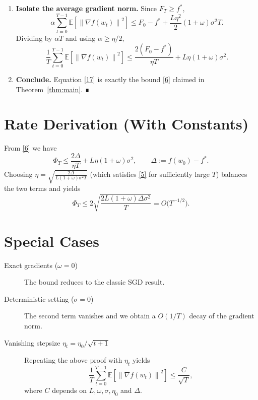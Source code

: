 \documentclass{article}
\newcommand{\EE}{\mathbb{E}}
\newcommand{\norm}[1]{\left\lVert#1\right\rVert}
\begin{document}
\begin{enumerate}[label=[Step \arabic*], leftmargin=*, itemsep=4pt]
\item \textbf{Isolate the average gradient norm.}  
Since $F_T\ge f^{*}$,
\[
\alpha\sum_{t=0}^{T-1}\EE\!\left[\norm{\nabla f(w_t)}^{2}\right]
\le F_0-f^{*}
    +\frac{L\eta^{2}}{2}(1+\omega)\sigma^{2}T.
\tag{16}
\]
Dividing by $\alpha T$ and using $\alpha\ge\eta/2$,
\[
\frac{1}{T}\sum_{t=0}^{T-1}\EE\!\left[\norm{\nabla f(w_t)}^{2}\right]
\le \frac{2(F_0-f^{*})}{\eta T}
   +L\eta(1+\omega)\sigma^{2}.
\tag{17}
\]

\item \textbf{Conclude.}  
Equation \eqref{17} is exactly the bound \eqref{6} claimed in Theorem~\ref{thm:main}. ∎
\end{enumerate}

\section*{Rate Derivation (With Constants)}
From \eqref{6} we have
\[
\Phi_T\le \frac{2\Delta}{\eta T}+L\eta(1+\omega)\sigma^{2},
\qquad \Delta:=f(w_0)-f^{*}.
\]
Choosing $\eta=\sqrt{\frac{2\Delta}{L(1+\omega)\sigma^{2}T}}$ (which satisfies \eqref{5} for sufficiently large $T$) balances the two terms and yields
\[
\Phi_T\le 2\sqrt{\frac{2L(1+\omega)\Delta\sigma^{2}}{T}}
      =O\!\bigl(T^{-1/2}\bigr).
\]

\section*{Special Cases}
\begin{description}
\item[Exact gradients ($\omega=0$)] The bound reduces to the classic SGD result.
\item[Deterministic setting ($\sigma=0$)] The second term vanishes and we obtain a $O(1/T)$ decay of the gradient norm.
\item[Vanishing stepsize $\eta_t=\eta_0/\sqrt{t+1}$] Repeating the above proof with $\eta_t$ yields
\[
\frac{1}{T}\sum_{t=0}^{T-1}\EE\!\left[\norm{\nabla f(w_t)}^{2}\right]
\le \frac{C}{\sqrt{T}},
\]
where $C$ depends on $L,\omega,\sigma,\eta_0$ and $\Delta$.
\end{description}
\end{document}
